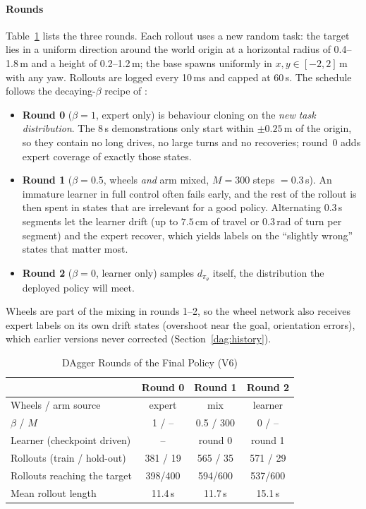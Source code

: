 \documentclass[conference]{IEEEtran}
\newcommand{\dagPi}{\pi_\theta}                        %
\begin{document}
\paragraph{Rounds} Table~\ref{dag:tab:rounds} lists the three rounds. Each rollout uses a new random task: the target lies in a uniform direction around the world origin at a horizontal radius of 0.4--1.8\,m and a height of 0.2--1.2\,m; the base spawns uniformly in $x,y\in[-2,2]$\,m with any yaw. Rollouts are logged every 10\,ms and capped at 60\,s. The schedule follows the decaying-$\beta$ recipe of \cite{ross2011reduction}:
\begin{itemize}
  \item \textbf{Round 0} ($\beta=1$, expert only) is behaviour cloning on the \emph{new task distribution}. The 8\,s demonstrations only start within $\pm0.25$\,m of the origin, so they contain no long drives, no large turns and no recoveries; round~0 adds expert coverage of exactly those states.
  \item \textbf{Round 1} ($\beta=0.5$, wheels \emph{and} arm mixed, $M=300$ steps $=0.3$\,s). An immature learner in full control often fails early, and the rest of the rollout is then spent in states that are irrelevant for a good policy. Alternating 0.3\,s segments let the learner drift (up to $7.5$\,cm of travel or $0.3$\,rad of turn per segment) and the expert recover, which yields labels on the ``slightly wrong'' states that matter most.
  \item \textbf{Round 2} ($\beta=0$, learner only) samples $d_{\dagPi}$ itself, the distribution the deployed policy will meet.
\end{itemize}
Wheels are part of the mixing in rounds 1--2, so the wheel network also receives expert labels on its own drift states (overshoot near the goal, orientation errors), which earlier versions never corrected (Section~\ref{dag:history}).

\begin{table}[t]
\caption{DAgger Rounds of the Final Policy (V6)}
\label{dag:tab:rounds}
\centering
\footnotesize
\renewcommand{\arraystretch}{1.12}
\begin{tabular}{@{}lccc@{}}
\toprule
 & Round 0 & Round 1 & Round 2\\
\midrule
Wheels / arm source & expert & mix & learner\\
$\beta$ / $M$ & 1 / -- & 0.5 / 300 & 0 / --\\
Learner (checkpoint driven) & -- & round 0 & round 1\\
Rollouts (train / hold-out) & 381 / 19 & 565 / 35 & 571 / 29\\
Rollouts reaching the target & 398/400 & 594/600 & 537/600\\
Mean rollout length & 11.4\,s & 11.7\,s & 15.1\,s\\
\bottomrule
\end{tabular}
\end{table}
\end{document}
